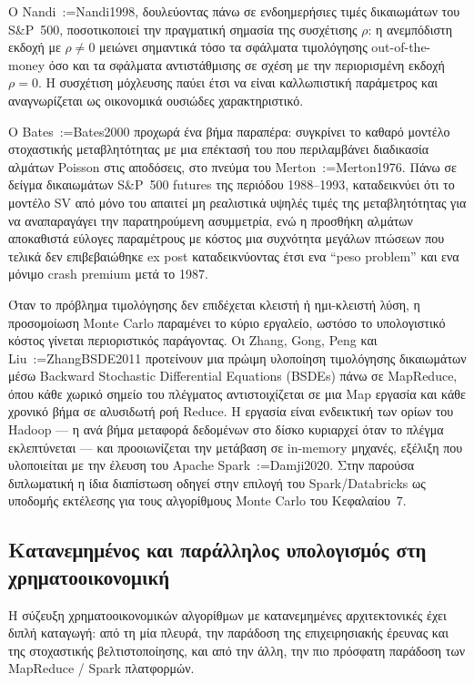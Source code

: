 \documentclass[12pt]{article}
\makeatletter
\newcommand{\citeyear}[1]{\@for\@tempa:=#1\do{\@ifundefined{cy@\@tempa}{(\@tempa)}{(\csname cy@\@tempa\endcsname)}}}
\makeatother
\begin{document}
Ο Nandi~\citeyear{Nandi1998}, δουλεύοντας πάνω σε ενδοημερήσιες τιμές δικαιωμάτων του S\&P~500, ποσοτικοποιεί την πραγματική σημασία της συσχέτισης $\rho$: η ανεμπόδιστη εκδοχή με $\rho \neq 0$ μειώνει σημαντικά τόσο τα σφάλματα τιμολόγησης out-of-the-money όσο και τα σφάλματα αντιστάθμισης σε σχέση με την περιορισμένη εκδοχή $\rho = 0$. Η συσχέτιση μόχλευσης παύει έτσι να είναι καλλωπιστική παράμετρος και αναγνωρίζεται ως οικονομικά ουσιώδες χαρακτηριστικό.

Ο Bates~\citeyear{Bates2000} προχωρά ένα βήμα παραπέρα: συγκρίνει το καθαρό μοντέλο στοχαστικής μεταβλητότητας με μια επέκτασή του που περιλαμβάνει διαδικασία αλμάτων Poisson στις αποδόσεις, στο πνεύμα του Merton~\citeyear{Merton1976}. Πάνω σε δείγμα δικαιωμάτων S\&P~500 futures της περιόδου 1988--1993, καταδεικνύει ότι το μοντέλο SV από μόνο του απαιτεί μη ρεαλιστικά υψηλές τιμές της μεταβλητότητας για να αναπαραγάγει την παρατηρούμενη ασυμμετρία, ενώ η προσθήκη αλμάτων αποκαθιστά εύλογες παραμέτρους με κόστος μια συχνότητα μεγάλων πτώσεων που τελικά δεν επιβεβαιώθηκε ex post καταδεικνύοντας έτσι ενα ``peso problem'' και ενα μόνιμο crash premium μετά το 1987.

Όταν το πρόβλημα τιμολόγησης δεν επιδέχεται κλειστή ή ημι-κλειστή λύση, η προσομοίωση Monte Carlo παραμένει το κύριο εργαλείο, ωστόσο το υπολογιστικό κόστος γίνεται περιοριστικός παράγοντας. Οι Zhang, Gong, Peng και Liu~\citeyear{ZhangBSDE2011} προτείνουν μια πρώιμη υλοποίηση τιμολόγησης δικαιωμάτων μέσω Backward Stochastic Differential Equations (BSDEs) πάνω σε MapReduce, όπου κάθε χωρικό σημείο του πλέγματος αντιστοιχίζεται σε μια Map εργασία και κάθε χρονικό βήμα σε αλυσιδωτή ροή Reduce. Η εργασία είναι ενδεικτική των ορίων του Hadoop — η ανά βήμα μεταφορά δεδομένων στο δίσκο κυριαρχεί όταν το πλέγμα εκλεπτύνεται — και προοιωνίζεται την μετάβαση σε in-memory μηχανές, εξέλιξη που υλοποιείται με την έλευση του Apache Spark~\citeyear{Damji2020}. Στην παρούσα διπλωματική η ίδια διαπίστωση οδηγεί στην επιλογή του Spark/Databricks ως υποδομής εκτέλεσης για τους αλγορίθμους Monte Carlo του Κεφαλαίου~7.

\subsection{Κατανεμημένος και παράλληλος υπολογισμός στη χρηματοοικονομική}
Η σύζευξη χρηματοοικονομικών αλγορίθμων με κατανεμημένες αρχιτεκτονικές έχει διπλή καταγωγή: από τη μία πλευρά, την παράδοση της επιχειρησιακής έρευνας και της στοχαστικής βελτιστοποίησης, και από την άλλη, την πιο πρόσφατη παράδοση των MapReduce / Spark πλατφορμών.
\end{document}
